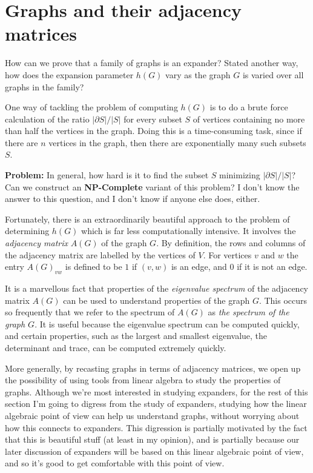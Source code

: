 \documentclass[12pt]{article}
\begin{document}
\section{Graphs and their adjacency matrices}

How can we prove that a family of graphs is an expander?  Stated
another way, how does the expansion parameter $h(G)$ vary as the graph
$G$ is varied over all graphs in the family?

One way of tackling the problem of computing $h(G)$ is to do a brute
force calculation of the ratio $|\partial S|/|S|$ for every subset $S$
of vertices containing no more than half the vertices in the graph.
Doing this is a time-consuming task, since if there are $n$ vertices
in the graph, then there are exponentially many such subsets $S$.

\textbf{Problem:} In general, how hard is it to find the subset $S$
minimizing $|\partial S|/|S|$?  Can we construct an
\textbf{NP-Complete} variant of this problem?  I don't know the answer
to this question, and I don't know if anyone else does, either.

Fortunately, there is an extraordinarily beautiful approach to the
problem of determining $h(G)$ which is far less computationally
intensive.  It involves the \emph{adjacency matrix} $A(G)$ of the
graph $G$.  By definition, the rows and columns of the adjacency
matrix are labelled by the vertices of $V$.  For vertices $v$ and $w$
the entry $A(G)_{vw}$ is defined to be $1$ if $(v,w)$ is an edge, and
$0$ if it is not an edge.

It is a marvellous fact that properties of the \emph{eigenvalue
  spectrum} of the adjacency matrix $A(G)$ can be used to understand
properties of the graph $G$.  This occurs so frequently that we refer
to the spectrum of $A(G)$ as \emph{the spectrum of the graph $G$}.  It
is useful because the eigenvalue spectrum can be computed quickly, and
certain properties, such as the largest and smallest eigenvalue, the
determinant and trace, can be computed extremely quickly.

More generally, by recasting graphs in terms of adjacency matrices, we
open up the possibility of using tools from linear algebra to study
the properties of graphs.  Although we're most interested in studying
expanders, for the rest of this section I'm going to digress from the
study of expanders, studying how the linear algebraic point of view
can help us understand graphs, without worrying about how this
connects to expanders. This digression is partially motivated by the
fact that this is beautiful stuff (at least in my opinion), and is
partially because our later discussion of expanders will be based on
this linear algebraic point of view, and so it's good to get
comfortable with this point of view.
\end{document}
